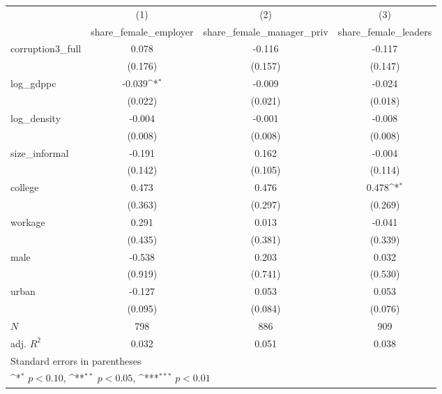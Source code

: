 {
\def\sym#1{\ifmmode^{#1}\else\(^{#1}\)\fi}
\begin{tabular}{l*{3}{c}}
\hline\hline
            &\multicolumn{1}{c}{(1)}&\multicolumn{1}{c}{(2)}&\multicolumn{1}{c}{(3)}\\
            &\multicolumn{1}{c}{share\_female\_employer}&\multicolumn{1}{c}{share\_female\_manager\_priv}&\multicolumn{1}{c}{share\_female\_leaders}\\
\hline
corruption3\_full&       0.078         &      -0.116         &      -0.117         \\
            &     (0.176)         &     (0.157)         &     (0.147)         \\
[1em]
log\_gdppc   &      -0.039\sym{*}  &      -0.009         &      -0.024         \\
            &     (0.022)         &     (0.021)         &     (0.018)         \\
[1em]
log\_density &      -0.004         &      -0.001         &      -0.008         \\
            &     (0.008)         &     (0.008)         &     (0.008)         \\
[1em]
size\_informal&      -0.191         &       0.162         &      -0.004         \\
            &     (0.142)         &     (0.105)         &     (0.114)         \\
[1em]
college     &       0.473         &       0.476         &       0.478\sym{*}  \\
            &     (0.363)         &     (0.297)         &     (0.269)         \\
[1em]
workage     &       0.291         &       0.013         &      -0.041         \\
            &     (0.435)         &     (0.381)         &     (0.339)         \\
[1em]
male        &      -0.538         &       0.203         &       0.032         \\
            &     (0.919)         &     (0.741)         &     (0.530)         \\
[1em]
urban       &      -0.127         &       0.053         &       0.053         \\
            &     (0.095)         &     (0.084)         &     (0.076)         \\
\hline
\(N\)       &         798         &         886         &         909         \\
adj. \(R^{2}\)&       0.032         &       0.051         &       0.038         \\
\hline\hline
\multicolumn{4}{l}{\footnotesize Standard errors in parentheses}\\
\multicolumn{4}{l}{\footnotesize \sym{*} \(p<0.10\), \sym{**} \(p<0.05\), \sym{***} \(p<0.01\)}\\
\end{tabular}
}
